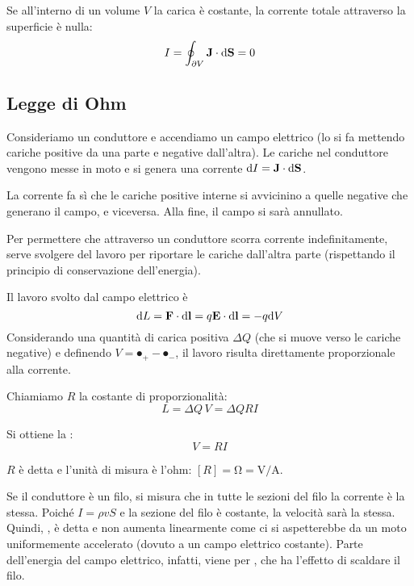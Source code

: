 Se all'interno di un volume $V$ la carica è costante, la corrente totale attraverso la superficie è nulla:
\begin{equation}
    I = \oint_{\partial V} \mathbf{J} \cdot \mathrm{d} \mathbf{S} = 0
\end{equation}

\subsection{Legge di Ohm}
\label{sec:legge_ohm}

Consideriamo un conduttore e accendiamo un campo elettrico (lo si fa mettendo cariche positive da una parte e negative dall'altra).
Le cariche nel conduttore vengono messe in moto e si genera una corrente $\mathrm{d} I = \mathbf{J} \cdot \mathrm{d} \mathbf{S}$.

La corrente fa sì che le cariche positive interne si avvicinino a quelle negative che generano il campo, e viceversa.
Alla fine, il campo si sarà annullato.

Per permettere che attraverso un conduttore scorra corrente indefinitamente, serve svolgere del lavoro per riportare le cariche dall'altra parte (rispettando il principio di conservazione dell'energia).

Il lavoro svolto dal campo elettrico è
\begin{equation}
    \mathrm{d} L = \mathbf{F} \cdot \mathrm{d} \mathbf{l} = q \mathbf{E} \cdot \mathrm{d} \mathbf{l} = - q \mathrm{d} V
\end{equation}
Considerando una quantità di carica positiva $\Delta Q$ (che si muove verso le cariche negative) e definendo $V = \spot_+ - \spot_-$, il lavoro risulta direttamente proporzionale alla corrente.

Chiamiamo $R$ la costante di proporzionalità:
\begin{equation}
    L = \Delta Q \, V = \Delta Q  R I
\end{equation}

Si ottiene la :
\begin{equation}
    V = R I
\end{equation}

$R$ è detta  e l'unità di misura è l'ohm: $[R] = \unit{\ohm} = \unit{\volt\per\ampere}$.

Se il conduttore è un filo, si misura che in tutte le sezioni del filo la corrente è la stessa.
Poiché $I = \rho v S$ e la sezione del filo è costante, la velocità sarà la stessa.
Quindi, , è detta  e non aumenta linearmente come ci si aspetterebbe da un moto uniformemente accelerato (dovuto a un campo elettrico costante).
Parte dell'energia del campo elettrico, infatti, viene  per , che ha l'effetto di scaldare il filo.

